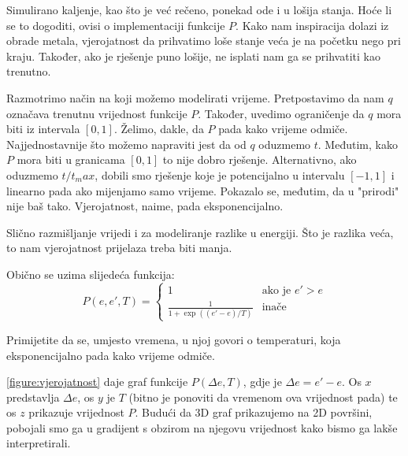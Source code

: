 \documentclass[times, utf8, zavrsni]{fer}
\begin{document}
Simulirano kaljenje, kao što je već rečeno, ponekad ode i u lošija
stanja. Hoće li se to dogoditi, ovisi o implementaciji funkcije
$P$. Kako nam inspiracija dolazi iz obrade metala, vjerojatnost da
prihvatimo loše stanje veća je na početku nego pri kraju. Također,
ako je rješenje puno lošije, ne isplati nam ga se prihvatiti kao
trenutno. 

Razmotrimo način na koji možemo modelirati vrijeme. Pretpostavimo
da nam $q$ označava trenutnu vrijednost funkcije $P$. Također,
uvedimo ograničenje da $q$ mora biti iz intervala $[0, 1]$.
Želimo, dakle, da $P$ pada kako vrijeme odmiče. Najjednostavnije
što možemo napraviti jest da od $q$ oduzmemo $t$. Međutim,
kako $P$ mora biti u granicama $[0, 1]$ to nije dobro rješenje.
Alternativno, ako oduzmemo $t/t_max$, dobili smo rješenje koje
je potencijalno u intervalu $[-1, 1]$ i linearno pada
ako mijenjamo samo vrijeme. Pokazalo se, međutim, da u "prirodi"
nije baš tako. Vjerojatnost, naime, pada eksponencijalno. 

Slično razmišljanje vrijedi i za modeliranje razlike u energiji.
Što je razlika veća, to nam vjerojatnost prijelaza treba biti manja.

Obično se uzima slijedeća funkcija: 
$$
P(e, e', T) = 
\left\{ \begin{array}{ll}
	1 & \mbox{ako je } e' > e \\
	\frac{1}{1+\exp ((e'-e)/T)} & \mbox{inače}
\end{array} \right.
$$

Primijetite da se, umjesto vremena, u njoj govori o temperaturi,
koja eksponencijalno pada kako vrijeme odmiče. 

\autoref{figure:vjerojatnost} daje graf funkcije $P(\Delta e, T)$, gdje
je $\Delta e = e'-e$. Os
$x$ predstavlja $\Delta e$, os $y$ je $T$ (bitno je ponoviti da
vremenom ova vrijednost pada) te os $z$ prikazuje vrijednost $P$. 
Budući da 3D graf prikazujemo na 2D površini, pobojali smo ga
u gradijent s obzirom na njegovu vrijednost kako bismo ga lakše 
interpretirali. 
\end{document}
